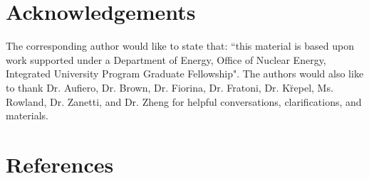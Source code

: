 \documentclass[review]{elsarticle}
\begin{document}
\section{Acknowledgements} \label{sec:ack}
The corresponding author would like to state that: ``this material is based
upon work supported under a Department of Energy, Office of Nuclear Energy,
Integrated University Program Graduate Fellowship". The authors would also
like to thank Dr. Aufiero, Dr. Brown, Dr. Fiorina, Dr. Fratoni,
Dr. K{\u r}epel, Ms. Rowland,
Dr. Zanetti, and Dr. Zheng for helpful conversations, clarifications, and
materials.  

\section*{References}


\end{document}
